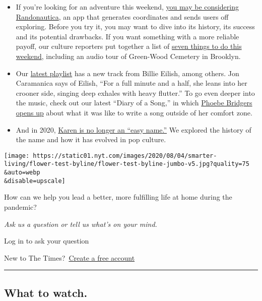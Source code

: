 \begin{itemize}
\item
  If you're looking for an adventure this weekend,
  \href{https://www.nytimes.com/2020/07/31/style/randonautica-app.html}{you
  may be considering Randonautica}, an app that generates coordinates
  and sends users off exploring. Before you try it, you may want to dive
  into its history, its success and its potential drawbacks. If you want
  something with a more reliable payoff, our culture reporters put
  together a list of
  \href{https://www.nytimes.com/2020/07/30/arts/things-to-do-weekend-coronavirus.html}{seven
  things to do this weekend}, including an audio tour of Green-Wood
  Cemetery in Brooklyn.
\item
  Our
  \href{https://www.nytimes.com/2020/07/31/arts/music/playlist-billie-eilish-snakehips-a-boogie.html}{latest
  playlist} has a new track from Billie Eilish, among others. Jon
  Caramanica says of Eilish, ``For a full minute and a half, she leans
  into her crooner side, singing deep exhales with heavy flutter.'' To
  go even deeper into the music, check out our latest ``Diary of a
  Song,'' in which
  \href{https://www.nytimes.com/2020/07/30/arts/music/phoebe-bridgers-kyoto.html}{Phoebe
  Bridgers opens up} about what it was like to write a song outside of
  her comfort zone.
\item
  And in 2020,
  \href{https://www.nytimes.com/2020/07/31/style/karen-name-meme-history.html}{Karen
  is no longer an ``easy name.''} We explored the history of the name
  and how it has evolved in pop culture.
\end{itemize}

\texttt{[image: https://static01.nyt.com/images/2020/08/04/smarter-living/flower-test-byline/flower-test-byline-jumbo-v5.jpg?quality=75\\\&auto=webp\\\&disable=upscale]}

How can we help you lead a better, more fulfilling life at home during
the pandemic?

\emph{Ask us a question or tell us what's on your mind.}

Log in to ask your question

New to The Times?~\protect\hyperlink{}{Create a free account}

\begin{center}\rule{0.5\linewidth}{\linethickness}\end{center}

\hypertarget{what-to-watch}{%
\subsection{What to watch.}\label{what-to-watch}}

